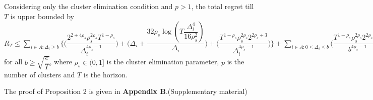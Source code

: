 	
	
	

\begin{proposition}
\label{Result:Prop:2}
Considering only the cluster elimination condition and $p>1$, the total regret till $T$ is upper bounded by $R_{T}\leq \sum_{i\in A:\Delta_{i}\geq b}\bigg\lbrace \bigg(\dfrac{2^{2+4\rho_{s}}\rho_{s}^{2\rho_{s}}T^{1-\rho_{s}}}{\Delta_{i}^{4\rho_{s}-1}}\bigg) + \bigg(\Delta_{i}+\dfrac{32\rho_{s}\log{(T\dfrac{\Delta_{i}^{4}}{16\rho_{s}^{2}})}}{\Delta_{i}}\bigg)  +  \bigg(\dfrac{T^{1-\rho_{s}}\rho_{s}^{2\rho_{s}}2^{2\rho_{s}+3}}{\Delta_{i}^{4\rho_{s} -1}} \bigg)\bigg \rbrace +\sum_{i\in A:0\leq\Delta_{i}\leq b}\bigg(\dfrac{T^{1-\rho_{s}}\rho_{s}^{2\rho_{s}}2^{2\rho_{s}+3}}{b^{4\rho_{s} -1}} \bigg) + max_{i:\Delta_{i}\leq b}\Delta_{i}T$ for all $b\geq \sqrt{\dfrac{e}{T}}$, where $\rho_{s}\in (0,1]$ is the cluster elimination parameter, $p$ is the number of clusters and $T$ is the horizon.
\end{proposition}

	The proof of Proposition 2 is given in \textbf{Appendix B}.(Supplementary material)



